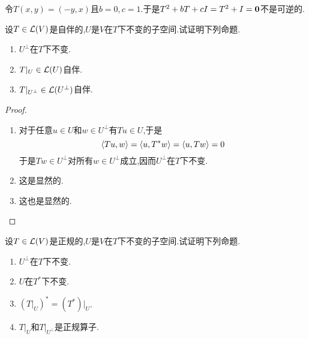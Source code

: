 \documentclass{ctexart}
\begin{document}
\begin{solution}
    令$T(x,y)=(-y,x)$且$b=0,c=1$.于是$T^2+bT+cI=T^2+I=\mathbf0$不是可逆的.
\end{solution}
\begin{problem}[19.]
    设$T\in\mathcal{L}(V)$是自伴的,$U$是$V$在$T$下不变的子空间.试证明下列命题.
    \begin{enumerate}[label=\tbf{(\arabic*)}]
        \item $U^\bot$在$T$下不变.
        \item $T|_U\in\mathcal{L}(U)$自伴.
        \item $T|_{U^\bot}\in\mathcal{L}(U^\bot)$自伴.
    \end{enumerate}
\end{problem}
\begin{proof}
    \begin{enumerate}[label=\tbf{(\arabic*)}]
        \item 对于任意$u\in U$和$w\in U^\bot$有$Tu\in U$,于是
            \[\left\langle{Tu},{w}\right\rangle=\left\langle{u},{T^*w}\right\rangle=\left\langle{u},{Tw}\right\rangle=0\]
            于是$Tw\in U^\bot$对所有$w\in U^\bot$成立,因而$U^\bot$在$T$下不变.
        \item 这是显然的.
        \item 这也是显然的.
    \end{enumerate}
\end{proof}
\begin{problem}[20.]
    设$T\in\mathcal{L}(V)$是正规的,$U$是$V$在$T$下不变的子空间.试证明下列命题.
    \begin{enumerate}[label=\tbf{(\arabic*)}]
        \item $U^\bot$在$T$下不变.
        \item $U$在$T^*$下不变.
        \item $\left(T|_U\right)^*=\left(T^*\right)|_U$.
        \item $T|_U$和$T|_{U^\bot}$是正规算子.
    \end{enumerate}
\end{problem}
\end{document}
